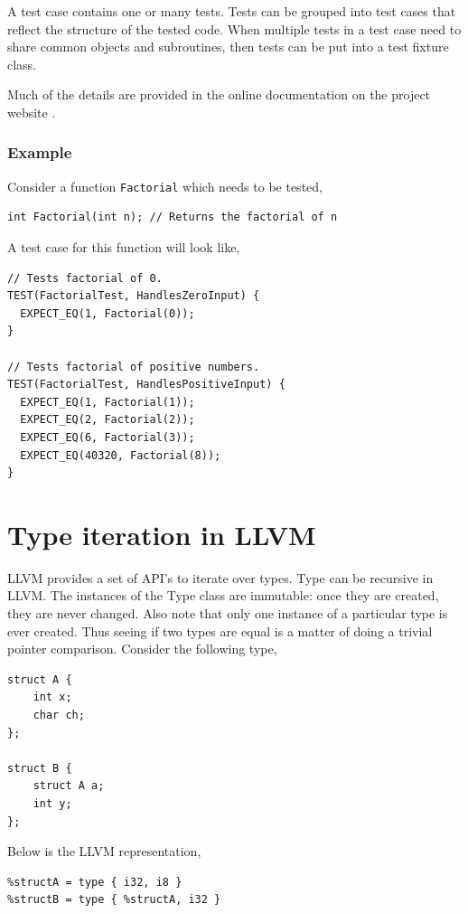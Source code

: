 \documentclass[a4paper,12pt]{report}
\begin{document}
A test case contains one or many tests. Tests can be grouped into test cases
that reflect the structure of the tested code. When multiple tests in a test case
need to share common objects and subroutines, then tests can be put into
a test fixture class.

Much of the details are provided in the online documentation on the project website
\cite{Gtest}.

\subsubsection{Example}
Consider a function \texttt{Factorial} which needs to be tested,

\begin{verbatim}
int Factorial(int n); // Returns the factorial of n
\end{verbatim}

A test case for this function will look like,

\begin{verbatim}
// Tests factorial of 0.
TEST(FactorialTest, HandlesZeroInput) {
  EXPECT_EQ(1, Factorial(0));
}

// Tests factorial of positive numbers.
TEST(FactorialTest, HandlesPositiveInput) {
  EXPECT_EQ(1, Factorial(1));
  EXPECT_EQ(2, Factorial(2));
  EXPECT_EQ(6, Factorial(3));
  EXPECT_EQ(40320, Factorial(8));
}
\end{verbatim}

\section{Type iteration in LLVM}
LLVM provides a set of API's to iterate over types. Type can be
recursive in LLVM. The instances of the Type class are immutable: once they are
created, they are never changed. Also note that only one instance of a
particular type is ever created. Thus seeing if two types are equal is a matter
of doing a trivial pointer comparison. Consider the following type,

\begin{verbatim}
struct A {
    int x;
    char ch;
};

struct B {
    struct A a;
    int y;
};
\end{verbatim}

Below is the LLVM representation,
\begin{verbatim}
%structA = type { i32, i8 }
%structB = type { %structA, i32 }
\end{verbatim}
\end{document}
